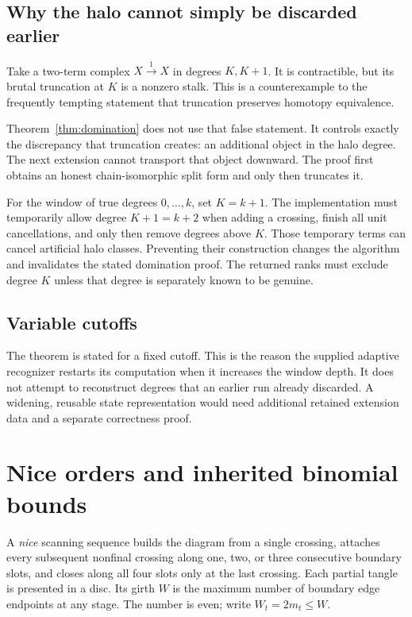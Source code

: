 \documentclass[11pt]{article}
\theoremstyle{definition}\newtheorem{definition}[theorem]{Definition}
\theoremstyle{remark}\newtheorem{remark}[theorem]{Remark}
\begin{document}
\subsection{Why the halo cannot simply be discarded earlier}
Take a two-term complex $X\xrightarrow{1}X$ in degrees $K,K+1$. It is contractible, but its brutal truncation at $K$ is a nonzero stalk. This is a counterexample to the frequently tempting statement that truncation preserves homotopy equivalence.

Theorem~\ref{thm:domination} does not use that false statement. It controls exactly the discrepancy that truncation creates: an additional object in the halo degree. The next extension cannot transport that object downward. The proof first obtains an honest chain-isomorphic split form and only then truncates it.

For the window of true degrees $0,\ldots,k$, set $K=k+1$. The implementation must temporarily allow degree $K+1=k+2$ when adding a crossing, finish all unit cancellations, and only then remove degrees above $K$. Those temporary terms can cancel artificial halo classes. Preventing their construction changes the algorithm and invalidates the stated domination proof. The returned ranks must exclude degree $K$ unless that degree is separately known to be genuine.

\subsection{Variable cutoffs}
The theorem is stated for a fixed cutoff. This is the reason the supplied adaptive recognizer restarts its computation when it increases the window depth. It does not attempt to reconstruct degrees that an earlier run already discarded. A widening, reusable state representation would need additional retained extension data and a separate correctness proof.

\section{Nice orders and inherited binomial bounds}
\label{sec:binomial}
A \emph{nice} scanning sequence builds the diagram from a single crossing, attaches every subsequent nonfinal crossing along one, two, or three consecutive boundary slots, and closes along all four slots only at the last crossing. Each partial tangle is presented in a disc. Its girth $W$ is the maximum number of boundary edge endpoints at any stage. The number is even; write $W_t=2m_t\leq W$.
\end{document}

